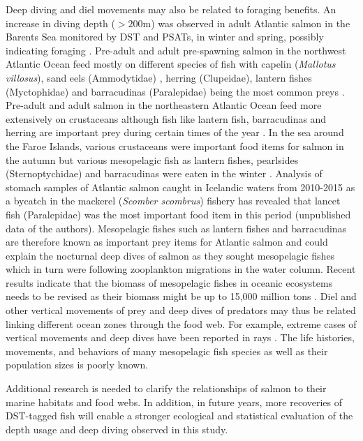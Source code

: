 Deep diving and diel movements may also be related to foraging benefits.
An increase in diving depth ($> 200$m) was observed in adult Atlantic salmon in the Barents Sea monitored by DST and PSATs, in winter and spring, possibly indicating foraging \citep{Hedger2017}. 
Pre-adult and adult pre-spawning salmon in the northwest Atlantic Ocean feed mostly on different species of fish with capelin (\textit{Mallotus villosus}), sand eels (Ammodytidae) , herring (Clupeidae), lantern fishes (Myctophidae) and barracudinas (Paralepidae) being the most common preys \citep{Rikardsen2011}. 
Pre-adult and adult salmon in the northeastern Atlantic Ocean feed more extensively on crustaceans although fish like lantern fish, barracudinas and herring are important prey during certain times of the year \citep{Rikardsen2011}. 
In the sea around the Faroe Islands, various crustaceans were important food items for salmon in the autumn but various mesopelagic fish as lantern fishes, pearlsides (Sternoptychidae) and barracudinas were eaten in the winter \citep{Jacobsen2001}. 
Analysis of stomach samples of Atlantic salmon caught in Icelandic waters from 2010-2015 as a bycatch in the mackerel (\textit{Scomber scombrus}) fishery has revealed that lancet fish (Paralepidae) was the most important food item in this period (unpublished data of the authors). 
Mesopelagic fishes such as lantern fishes and barracudinas are therefore known as important prey items for Atlantic salmon and could explain the nocturnal deep dives of salmon as they sought mesopelagic fishes which in turn were  following zooplankton migrations in the water column.
Recent results indicate that the biomass of mesopelagic fishes in oceanic ecosystems needs to be revised as their biomass might be up to 15,000 million tons \citep{Irigoien2014}. 
Diel and other vertical movements of prey and deep dives of predators may thus be related linking different ocean zones through the food web. 
For example, extreme cases of vertical movements and deep dives have been reported in rays \citep{Thorrold2014}. 
The life histories, movements, and behaviors of many mesopelagic fish species as well as their population sizes is poorly known. 

Additional research is needed to clarify the relationships of salmon to their marine habitats and food webs. In addition, in future years, more recoveries of DST-tagged fish will enable a stronger ecological and statistical evaluation of the depth usage and deep diving observed in this study. 

